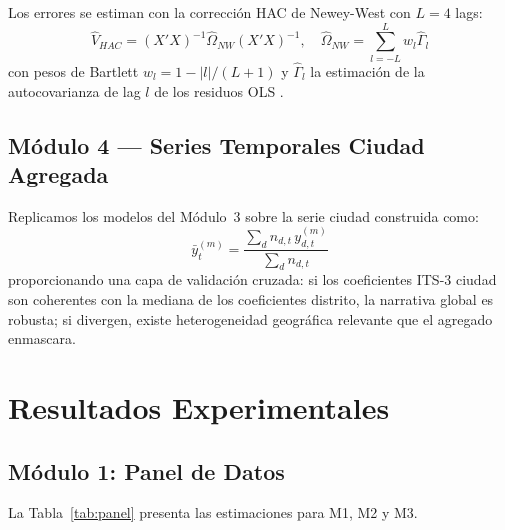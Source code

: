 \documentclass[10pt,a4paper,twocolumn]{article}
\begin{document}
Los errores se estiman con la corrección HAC de Newey-West con $L{=}4$ lags:
\begin{equation}
  \hat{V}_{HAC} = (X'X)^{-1} \hat{\Omega}_{NW} (X'X)^{-1}, \quad
  \hat{\Omega}_{NW} = \sum_{l=-L}^{L} w_l \hat{\Gamma}_l
  \label{eq:hac}
\end{equation}
con pesos de Bartlett $w_l = 1 - |l|/(L{+}1)$ y $\hat{\Gamma}_l$ la estimación
de la autocovarianza de lag $l$ de los residuos OLS \citep{newey1987hac}.

\subsection{Módulo 4 --- Series Temporales Ciudad Agregada}

Replicamos los modelos del Módulo~3 sobre la serie ciudad construida como:
\begin{equation}
  \bar{y}_t^{(m)} = \frac{\sum_{d} n_{d,t}\, y_{d,t}^{(m)}}{\sum_{d} n_{d,t}}
  \label{eq:city_weighted}
\end{equation}
proporcionando una capa de validación cruzada: si los coeficientes ITS-3 ciudad son
coherentes con la mediana de los coeficientes distrito, la narrativa global es
robusta; si divergen, existe heterogeneidad geográfica relevante que el agregado
enmascara.

\section{Resultados Experimentales}
\label{sec:resultados}

\subsection{Módulo 1: Panel de Datos}

La Tabla~\ref{tab:panel} presenta las estimaciones para M1, M2 y M3.
\end{document}

